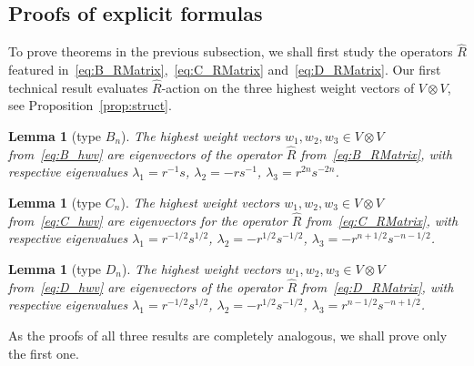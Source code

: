 \documentclass[10pt,a4paper]{amsart}
\numberwithin{equation}{section}
\newtheorem{Lemma}[Theorem]{Lemma}
\begin{document}
\subsection{Proofs of explicit formulas}%

To prove theorems in the previous subsection, we shall first study the operators $\hat{R}$ featured in~\eqref{eq:B_RMatrix},~\eqref{eq:C_RMatrix} and~\eqref{eq:D_RMatrix}. Our first technical result evaluates $\hat{R}$-action on the three highest weight vectors of $V\otimes V$, see Proposition~\ref{prop:struct}.

\begin{Lemma}[type $B_{n}$]\label{lem:B_eigen}
The highest weight vectors $w_{1}, w_{2}, w_{3}\in V\otimes V$ from~\eqref{eq:B_hwv} are eigenvectors of the operator $\hat{R}$ from~\eqref{eq:B_RMatrix}, with respective eigenvalues $\lambda_{1}=r^{-1}s$, $\lambda_{2} = -rs^{-1}$, $\lambda_{3} = r^{2n}s^{-2n}$.
\end{Lemma}

\begin{Lemma}[type $C_{n}$]\label{lem:C_eigen}
The highest weight vectors $w_{1}, w_{2}, w_{3}\in V\otimes V$ from~\eqref{eq:C_hwv} are eigenvectors for the operator $\hat{R}$ from~\eqref{eq:C_RMatrix}, with respective eigenvalues $\lambda_{1} = r^{-1/2}s^{1/2}$, $\lambda_{2} = -r^{1/2}s^{-1/2}$, $\lambda_{3} = -r^{n + 1/2}s^{-n-1/2}$.
\end{Lemma}

\begin{Lemma}[type $D_{n}$]\label{lem:D_eigen}
The highest weight vectors $w_{1}, w_{2}, w_{3}\in V\otimes V$ from~\eqref{eq:D_hwv} are eigenvectors of the operator $\hat{R}$ from~\eqref{eq:D_RMatrix}, with respective eigenvalues $\lambda_{1} = r^{-1/2}s^{1/2}$, $\lambda_{2} = -r^{1/2}s^{-1/2}$, $\lambda_{3} = r^{n-1/2}s^{-n+1/2}$.
\end{Lemma}

As the proofs of all three results are completely analogous, we shall prove only the first one.
\end{document}
